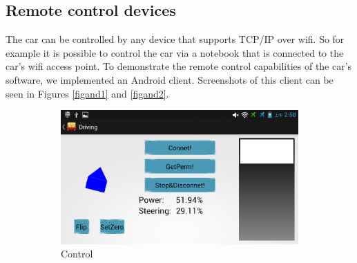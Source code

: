 \documentclass[a4paper
               ,10pt
               ,DIV=10 %
               ,BCOR=0.3cm
               ,pagesize %
               ,headings=small
               ,bibtotoc
               ]
               {scrartcl}
\begin{document}
\subsection{Remote control devices}
The car can be controlled by any device that supports TCP/IP over wifi.
So for example it is possible to control the car via a notebook that is connected to the car's wifi access point.
To demonstrate the remote control capabilities of the car's software, we implemented an Android client. Screenshots of this client can be seen in Figures \ref{figand1} and \ref{figand2}.
\begin{figure}[H]
  \centering
  \begin{subfigure}[b]{0.7\textwidth}
    \centering
    \includegraphics[width=\textwidth]{pic/figand1.png}
    \caption{Control}
  \end{subfigure}~
  \begin{subfigure}[b]{0.3\textwidth}
    \centering

\end{subfigure}
\end{figure}
\end{document}
